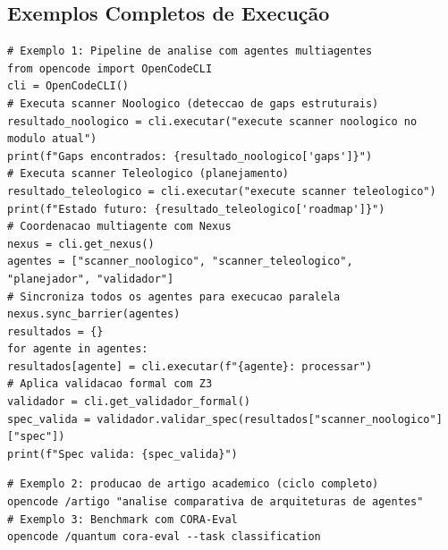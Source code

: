 \subsection{Exemplos Completos de Execução}
\begin{lstlisting}[style=pythonstyle]
# Exemplo 1: Pipeline de analise com agentes multiagentes
from opencode import OpenCodeCLI
cli = OpenCodeCLI()
# Executa scanner Noologico (deteccao de gaps estruturais)
resultado_noologico = cli.executar("execute scanner noologico no modulo atual")
print(f"Gaps encontrados: {resultado_noologico['gaps']}")
# Executa scanner Teleologico (planejamento)
resultado_teleologico = cli.executar("execute scanner teleologico")
print(f"Estado futuro: {resultado_teleologico['roadmap']}")
# Coordenacao multiagente com Nexus
nexus = cli.get_nexus()
agentes = ["scanner_noologico", "scanner_teleologico",
"planejador", "validador"]
# Sincroniza todos os agentes para execucao paralela
nexus.sync_barrier(agentes)
resultados = {}
for agente in agentes:
resultados[agente] = cli.executar(f"{agente}: processar")
# Aplica validacao formal com Z3
validador = cli.get_validador_formal()
spec_valida = validador.validar_spec(resultados["scanner_noologico"]["spec"])
print(f"Spec valida: {spec_valida}")
\end{lstlisting}
\begin{lstlisting}[style=bashstyle]
# Exemplo 2: producao de artigo academico (ciclo completo)
opencode /artigo "analise comparativa de arquiteturas de agentes"
# Exemplo 3: Benchmark com CORA-Eval
opencode /quantum cora-eval --task classification
\end{lstlisting}
